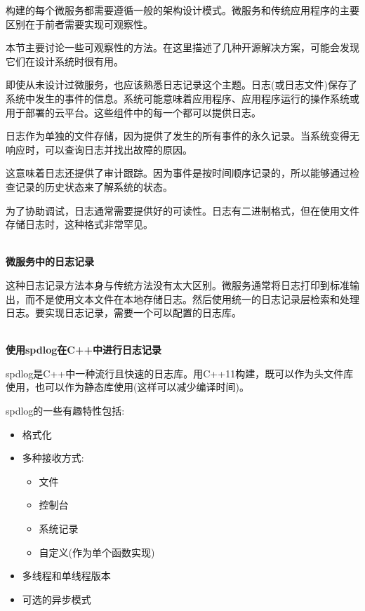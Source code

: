 
构建的每个微服务都需要遵循一般的架构设计模式。微服务和传统应用程序的主要区别在于前者需要实现可观察性。

本节主要讨论一些可观察性的方法。在这里描述了几种开源解决方案，可能会发现它们在设计系统时很有用。


即使从未设计过微服务，也应该熟悉日志记录这个主题。日志(或日志文件)保存了系统中发生的事件的信息。系统可能意味着应用程序、应用程序运行的操作系统或用于部署的云平台。这些组件中的每一个都可以提供日志。

日志作为单独的文件存储，因为提供了发生的所有事件的永久记录。当系统变得无响应时，可以查询日志并找出故障的原因。

这意味着日志还提供了审计跟踪。因为事件是按时间顺序记录的，所以能够通过检查记录的历史状态来了解系统的状态。

为了协助调试，日志通常需要提供好的可读性。日志有二进制格式，但在使用文件存储日志时，这种格式非常罕见。

\hspace*{\fill} \\ %
\noindent
\textbf{微服务中的日志记录}

这种日志记录方法本身与传统方法没有太大区别。微服务通常将日志打印到标准输出，而不是使用文本文件在本地存储日志。然后使用统一的日志记录层检索和处理日志。要实现日志记录，需要一个可以配置的日志库。

\hspace*{\fill} \\ %
\noindent
\textbf{使用spdlog在C++中进行日志记录}

spdlog是C++中一种流行且快速的日志库。用C++11构建，既可以作为头文件库使用，也可以作为静态库使用(这样可以减少编译时间)。

spdlog的一些有趣特性包括:

\begin{itemize}
\item 
格式化

\item 
多种接收方式:
\begin{itemize}
\item 
文件

\item 
控制台

\item 
系统记录

\item 
自定义(作为单个函数实现)
\end{itemize}

\item 
多线程和单线程版本

\item 
可选的异步模式
\end{itemize}

